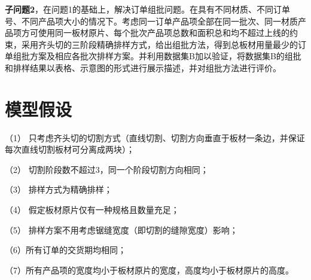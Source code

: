 \documentclass[bwprint]{gmcmthesis}
\begin{document}
\textbf{子问题2}，在问题1的基础上，解决订单组批问题。在具有不同材质、不同订单号、不同产品项大小的情况下。考虑同一订单产品项全部在同一批次、同一材质产品项方可使用同一板材原片、每个批次产品项总数和面积总和均不超过上线的约束，采用齐头切的三阶段精确排样方式，给出组批方法，得到总板材用量最少的订单组批方案及相应各批次排样方案。并利用数据集B加以验证，将数据集B的组批和排样结果以表格、示意图的形式进行展示描述，并对组批方法进行评价。

\newpage

\section{模型假设}

（1） 只考虑齐头切的切割方式（直线切割、切割方向垂直于板材一条边，并保证每次直线切割板材可分离成两块）；

（2） 切割阶段数不超过3，同一个阶段切割方向相同；

（3） 排样方式为精确排样；

（4） 假定板材原片仅有一种规格且数量充足；

（5） 排样方案不用考虑锯缝宽度（即切割的缝隙宽度）影响；

（6）所有订单的交货期均相同；

（7）所有产品项的宽度均小于板材原片的宽度，高度均小于板材原片的高度。

\quad
\end{document}
